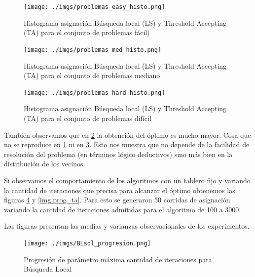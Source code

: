 \documentclass[a4paper,spanish]{article}
\begin{document}
\begin{center}
    \begin{figure}
        \texttt{[image: ./imgs/problemas\_easy\_histo.png]}
        \caption{Histograma asignación Búsqueda local (LS) y Threshold
        Accepting (TA) para el conjunto de problemas fácil)}
        \label{img:histo_easy}
    \end{figure}
\end{center}
\begin{center}
    \begin{figure}
        \texttt{[image: ./imgs/problemas\_med\_histo.png]}
        \caption{Histograma asignación Búsqueda local (LS) y Threshold
        Accepting (TA) para el conjunto de problemas mediano}
        \label{img:histo_med}
    \end{figure}
\end{center}
\begin{center}
    \begin{figure}
        \texttt{[image: ./imgs/problemas\_hard\_histo.png]}
        \caption{Histograma asignación Búsqueda local (LS) y Threshold
        Accepting (TA) para el conjunto de problemas difícil}
        \label{img:histo_hard}
    \end{figure}
\end{center}

También observamos que en \ref{img:histo_med} la obtención del óptimo es mucho
mayor. Cosa que no se reproduce en \ref{img:histo_easy} ni en
\ref{img:histo_hard}. Esto nos muestra que no depende de la facilidad de
resolución del problema (en términos lógico deductivos) sino más bien en la
distribución de los vecinos.

Si observamos el comportamiento de los algoritmos con un tablero fijo y variando
la cantidad de iteraciones que precisa para alcanzar el óptimo obtenemos las
figuras \ref{img:prog_ls} y \ref{img:prog_ta}. Para esto se generaron 50
corridas de asignación variando la cantidad de iteraciones admitidas para el
algoritmo de 100 a 3000.

Las figuras presentan las medias y varianzas observacionales de los
experimentos.


\begin{center}
    \begin{figure}[H]
        \texttt{[image: ./imgs/BLsol\_progresion.png]}
        \caption{Progresión de parámetro máxima cantidad de iteraciones para Búsqueda Local}
        \label{img:prog_ls}
    \end{figure}
\end{center}
\end{document}
